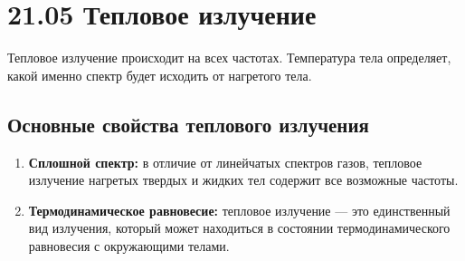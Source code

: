 \section{\texorpdfstring{21.05 \quad Тепловое излучение}{21.05 Тепловое излучение}}

Тепловое излучение происходит на всех частотах. Температура тела определяет, какой именно спектр будет исходить от нагретого тела.

\subsection{Основные свойства теплового излучения}

\begin{enumerate}
	\item \textbf{Сплошной спектр:} в отличие от линейчатых спектров газов, тепловое излучение нагретых твердых и жидких тел содержит все возможные частоты.
	\item \textbf{Термодинамическое равновесие:} тепловое излучение --- это единственный вид излучения, который может находиться в состоянии термодинамического равновесия с окружающими телами.
\end{enumerate}


